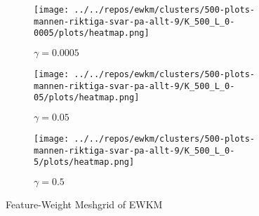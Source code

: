 \documentclass[../report.tex]{subfiles}
\begin{document}


\newpage
\begin{figure}[H]
  \centering
  \begin{subfigure}{0.7\textwidth}
    \begin{center}
      \texttt{[image: ../../repos/ewkm/clusters/500-plots-mannen-riktiga-svar-pa-allt-9/K\_500\_L\_0-0005/plots/heatmap.png]}
      \caption{$\gamma=0.0005$}
    \end{center}
  \end{subfigure}
  \medskip
  \centering
  \begin{subfigure}{0.7\textwidth}
    \begin{center}
      \texttt{[image: ../../repos/ewkm/clusters/500-plots-mannen-riktiga-svar-pa-allt-9/K\_500\_L\_0-05/plots/heatmap.png]}
      \caption{$\gamma=0.05$}
    \end{center}
  \end{subfigure}
  \medskip
  \centering
  \begin{subfigure}{0.7\textwidth}
    \begin{center}
      \texttt{[image: ../../repos/ewkm/clusters/500-plots-mannen-riktiga-svar-pa-allt-9/K\_500\_L\_0-5/plots/heatmap.png]}
      \caption{$\gamma=0.5$}
    \end{center}
  \end{subfigure}
  \caption{Feature-Weight Meshgrid of EWKM}
  \label{fig:ewkm-meshgrid}
\end{figure}
\newpage



\end{document}
